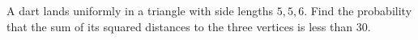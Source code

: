 A dart lands uniformly in a triangle with side lengths $5,5,6$. Find the probability that the sum of its squared distances to the three vertices is less than 30.
